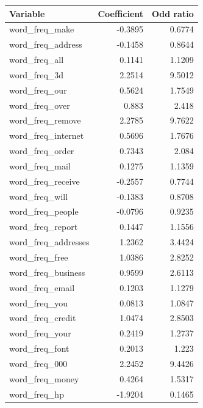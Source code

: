 \begin{homeworkProblem}
\begin{homeworkSection}{2.1}
{			}
			
			\begin{table}[htbp]
			\footnotesize
			\begin{center}
			\begin{tabular}{|l|r|r|}
				\hline
				\textbf{Variable} & \multicolumn{1}{l|}{\textbf{Coefficient}} & \multicolumn{1}{l|}{\textbf{Odd ratio}} \\ \hline
				word\_freq\_make & -0.3895 & 0.6774 \\ \hline
				word\_freq\_address & -0.1458 & 0.8644 \\ \hline
				word\_freq\_all & 0.1141 & 1.1209 \\ \hline
				word\_freq\_3d & 2.2514 & 9.5012 \\ \hline
				word\_freq\_our & 0.5624 & 1.7549 \\ \hline
				word\_freq\_over & 0.883 & 2.418 \\ \hline
				word\_freq\_remove & 2.2785 & 9.7622 \\ \hline
				word\_freq\_internet & 0.5696 & 1.7676 \\ \hline
				word\_freq\_order & 0.7343 & 2.084 \\ \hline
				word\_freq\_mail & 0.1275 & 1.1359 \\ \hline
				word\_freq\_receive & -0.2557 & 0.7744 \\ \hline
				word\_freq\_will & -0.1383 & 0.8708 \\ \hline
				word\_freq\_people & -0.0796 & 0.9235 \\ \hline
				word\_freq\_report & 0.1447 & 1.1556 \\ \hline
				word\_freq\_addresses & 1.2362 & 3.4424 \\ \hline
				word\_freq\_free & 1.0386 & 2.8252 \\ \hline
				word\_freq\_business & 0.9599 & 2.6113 \\ \hline
				word\_freq\_email & 0.1203 & 1.1279 \\ \hline
				word\_freq\_you & 0.0813 & 1.0847 \\ \hline
				word\_freq\_credit & 1.0474 & 2.8503 \\ \hline
				word\_freq\_your & 0.2419 & 1.2737 \\ \hline
				word\_freq\_font & 0.2013 & 1.223 \\ \hline
				word\_freq\_000 & 2.2452 & 9.4426 \\ \hline
				word\_freq\_money & 0.4264 & 1.5317 \\ \hline
				word\_freq\_hp & -1.9204 & 0.1465 \\ \hline

\end{tabular}
\end{center}
\end{table}
\end{homeworkSection}
\end{homeworkProblem}
